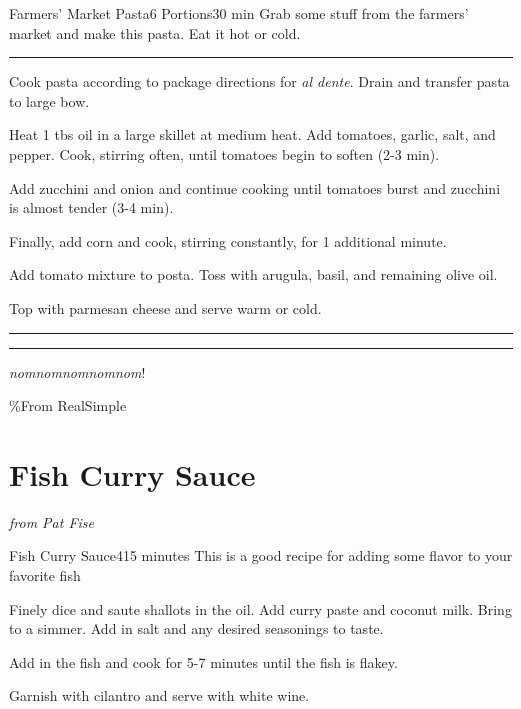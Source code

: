 \documentclass[openany]{book}
\begin{document}
\begin{recipe}[FarmersMarketPasta]{Farmers' Market Pasta}{6 Portions}{30 min}
\freeform Grab some stuff from the farmers' market and make this pasta. Eat it hot or cold.
\freeform\rule{\textwidth}{0.05pt}

Cook pasta according to package directions for \textit{al dente}. Drain and transfer pasta to large bow.


Heat 1 tbs oil in a large skillet at medium heat. Add tomatoes, garlic, salt, and pepper. Cook, stirring often, until tomatoes begin to soften (2-3 min).  


Add zucchini and onion and continue cooking until tomatoes burst and zucchini is almost tender (3-4 min).


Finally, add corn and cook, stirring constantly, for 1 additional minute.


Add tomato mixture to posta. Toss with arugula, basil, and remaining olive oil.


Top with parmesan cheese and serve warm or cold.


\freeform\rule{\textwidth}{0.05pt}

\freeform\rule{\textwidth}{0.05pt}
\textit{nomnomnomnomnom}!
\end{recipe}

\%From RealSimple

\chapter{Fish Curry Sauce}\label{fish-curry-sauce}

\emph{from Pat Fise}

\begin{recipe}{Fish Curry Sauce}{4}{15 minutes}
\freeform This is a good recipe for adding some flavor to your favorite fish

Finely dice and saute shallots in the oil. Add curry paste and coconut milk. Bring to a simmer. Add in salt and any desired seasonings to taste.

Add in the fish and cook for 5-7 minutes until the fish is flakey.

\freeform Garnish with cilantro and serve with white wine.
\end{recipe}
\end{document}
